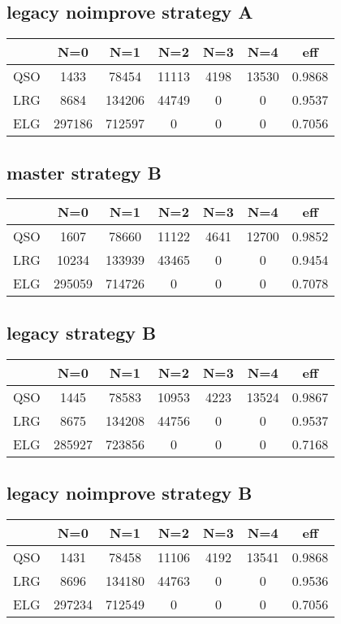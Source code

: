 \documentclass{article}
\begin{document}
\subsection*{legacy noimprove strategy A}
\begin{center}
\begin{tabular}{l|ccccc|c}
 & N=0 & N=1 & N=2 & N=3 & N=4 & eff\\\hline
QSO & 1433 &  78454 &  11113 &  4198 &  13530 &  0.9868\\
LRG & 8684 &  134206 &  44749 &  0 &  0 &  0.9537\\
ELG & 297186 &  712597 &  0 &  0 &  0 &  0.7056\\
\end{tabular}
\end{center}

\subsection*{master strategy B}
\begin{center}
\begin{tabular}{l|ccccc|c}
 & N=0 & N=1 & N=2 & N=3 & N=4 & eff\\\hline
QSO &  1607 &  78660 &  11122 &  4641 &  12700 &  0.9852\\
LRG &  10234 &  133939 &  43465 &  0 &  0 &  0.9454\\
ELG &  295059 &  714726 &  0 &  0 &  0 &  0.7078\\
\end{tabular}
\end{center}

\subsection*{legacy strategy B}
\begin{center}
\begin{tabular}{l|ccccc|c}
 & N=0 & N=1 & N=2 & N=3 & N=4 & eff\\\hline
QSO & 1445 &  78583 &  10953 &  4223 &  13524 &  0.9867\\
LRG & 8675 &  134208 &  44756 &  0 &  0 &  0.9537\\
ELG & 285927 &  723856 &  0 &  0 &  0 &  0.7168\\
\end{tabular}
\end{center}

\subsection*{legacy noimprove strategy B}
\begin{center}
\begin{tabular}{l|ccccc|c}
 & N=0 & N=1 & N=2 & N=3 & N=4 & eff\\\hline
QSO &  1431 &  78458 &  11106 &  4192 &  13541 &  0.9868\\
LRG &  8696 &  134180 &  44763 &  0 &  0 &  0.9536 \\
ELG &  297234 &  712549 &  0 &  0 &  0 &  0.7056\\
\end{tabular}
\end{center}
\end{document}
